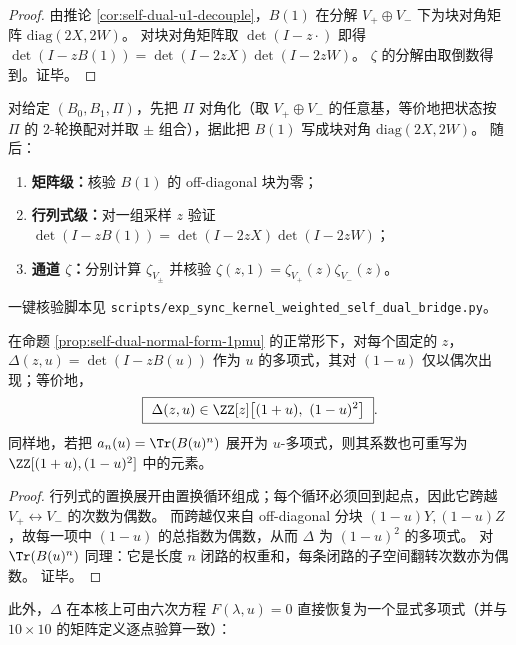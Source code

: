 \begin{proof}
由推论 \ref{cor:self-dual-u1-decouple}，\(B(1)\) 在分解 \(V_+\oplus V_-\) 下为块对角矩阵 \(\mathrm{diag}(2X,2W)\)。
对块对角矩阵取 \(\det(I-z\cdot)\) 即得
\(
\det(I-zB(1))=\det(I-2zX)\det(I-2zW)
\)。
\(\zeta\) 的分解由取倒数得到。证毕。
\end{proof}

\begin{remark}\label{rem:sync-kernel-u1-two-channel-bridge}
对给定 \((B_0,B_1,\Pi)\)，先把 \(\Pi\) 对角化（取 \(V_+\oplus V_-\) 的任意基，等价地把状态按 \(\Pi\) 的 \(2\)-轮换配对并取 \(\pm\) 组合），据此把 \(B(1)\) 写成块对角 \(\mathrm{diag}(2X,2W)\)。
随后：
\begin{enumerate}
  \item \textbf{矩阵级：}核验 \(B(1)\) 的 off-diagonal 块为零；
  \item \textbf{行列式级：}对一组采样 \(z\) 验证 \(\det(I-zB(1))=\det(I-2zX)\det(I-2zW)\)；
  \item \textbf{通道 \(\zeta\)：}分别计算 \(\zeta_{V_\pm}\) 并核验 \(\zeta(z,1)=\zeta_{V_+}(z)\zeta_{V_-}(z)\)。
\end{enumerate}
一键核验脚本见 \texttt{scripts/exp\_sync\_kernel\_weighted\_self\_dual\_bridge.py}。
\end{remark}

\begin{corollary}\label{cor:self-dual-delta-even-in-1mu}
在命题 \ref{prop:self-dual-normal-form-1pmu} 的正常形下，对每个固定的 \(z\)，
\(\Delta(z,u)=\det(I-zB(u))\)
作为 \(u\) 的多项式，其对 \((1-u)\) 仅以偶次出现；等价地，
\[
\boxed{\ \Delta(z,u)\in \ZZ[z]\bigl[(1+u),\ (1-u)^2\bigr]\ }.
\]
同样地，若把 \(a_n(u)=\Tr(B(u)^n)\) 展开为 \(u\)-多项式，则其系数也可重写为 \(\ZZ[(1+u),(1-u)^2]\) 中的元素。
\end{corollary}
\begin{proof}
行列式的置换展开由置换循环组成；每个循环必须回到起点，因此它跨越 \(V_+\leftrightarrow V_-\) 的次数为偶数。
而跨越仅来自 off-diagonal 分块 \((1-u)Y,(1-u)Z\)，故每一项中 \((1-u)\) 的总指数为偶数，从而 \(\Delta\) 为 \((1-u)^2\) 的多项式。
对 \(\Tr(B(u)^n)\) 同理：它是长度 \(n\) 闭路的权重和，每条闭路的子空间翻转次数亦为偶数。
证毕。
\end{proof}

此外，\(\Delta\) 在本核上可由六次方程 \(F(\lambda,u)=0\) 直接恢复为一个显式多项式（并与 \(10\times 10\) 的矩阵定义逐点验算一致）：


